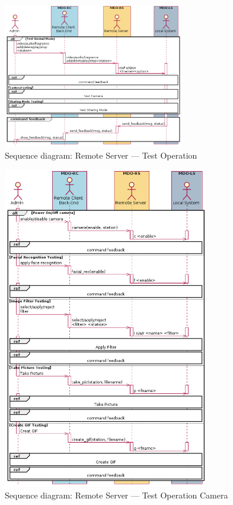 \begin{figure}[htb!]
  \centering
  \includegraphics[width=0.7\textwidth]{img/seq-rs-test-op.png}%
  \caption{Sequence diagram: Remote Server --- Test Operation}%
  \label{fig:seq-rs-test-op}
\end{figure}

\begin{figure}[htb!]
  \centering
  \includegraphics[width=0.8\textwidth]{img/seq-rs-test-op-camera.png}%
  \caption{Sequence diagram: Remote Server --- Test Operation Camera}%
  \label{fig:seq-rs-test-op-camera}
\end{figure}

